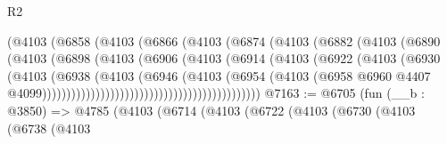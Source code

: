 \begin{lexlean}{R2}
\begin{coremodule}
                                      (@4103
                                        (@6858
                                          (@4103
                                            (@6866
                                              (@4103
                                                (@6874
                                                  (@4103
                                                    (@6882
                                                      (@4103
                                                        (@6890
                                                          (@4103
                                                            (@6898
                                                              (@4103
                                                                (@6906
                                                                  (@4103
                                                                    (@6914
                                                                      (@4103
                                                                        (@6922
                                                                          (@4103
                                                                            (@6930
                                                                              (@4103
                                                                                (@6938
                                                                                  (@4103
                                                                                    (@6946
                                                                                      (@4103
                                                                                        (@6954
                                                                                          (@4103
                                                                                            (@6958
                                                                                              @6960
                                                                                              @4407
                                                                                              @4099)))))))))))))))))))))))))))))))))))))))))))))
@7163 := @6705
    (fun (__b : @3850) =>
    @4785
      (@4103
        (@6714
          (@4103
            (@6722
              (@4103
                (@6730
                  (@4103
                    (@6738
                      (@4103

\end{coremodule}
\end{lexlean}
